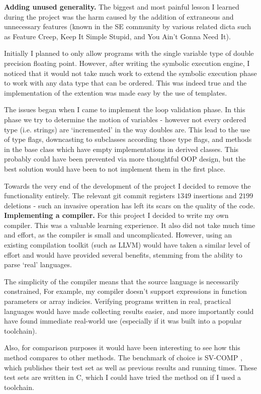 \documentclass[12pt,a4paper]{article}
\begin{document}
\textbf{Adding unused generality.} The biggest and most painful lesson I learned during the project was the harm caused by the addition of extraneous and unnecessary features (known in the SE community
by various related dicta such as Feature Creep, Keep It Simple Stupid, and You Ain't Gonna Need It).

Initially I planned to only allow programs with the single variable type
of double precision floating point. However, after writing the symbolic execution engine, I noticed that it would not take much work to extend the symbolic execution phase to work with any
data type that can be ordered. This was indeed true and the implementation of the extention was made easy by the use of templates.

The issues began when I came to implement the loop validation phase. In this phase we try to determine the motion of variables - however not every ordered type (i.e. strings) are `incremented' in the way doubles are. This lead to the use of type flags, downcasting to subclasses according those type flags, and methods in the
base class which have empty implementations in derived classes. This probably could have been prevented via more thoughtful OOP design, but the best solution would
have been to not implement them in the first place.

Towards the very end of the development of the project I decided to remove the functionality entirely. The relevant git commit registers
$1349$ insertions and $2199$ deletions - such an invasive operation has left its scars on the quality of the code.
\\

\textbf{Implementing a compiler.} For this project I decided to write my own compiler. This was a valuable learning experience. It also did not take much time and effort, as the compiler is small
and uncomplicated. However, using an existing compilation toolkit (such as LLVM) would have taken a similar level of effort and would have provided several benefits,
stemming from the ability to parse `real' languages.

The simplicity of the compiler means that the source language is necessarily constrained, For example, my compiler doesn't support 
expressions in function parameters or array indicies. Verifying programs written in real, practical languages would have made collecting results easier, and more 
importantly could have found immediate real-world use (especially if it was built into a popular toolchain).

Also, for comparison purposes it would have been interesting to see how this method
compares to other methods. The benchmark of choice is SV-COMP \citep{svcomp}, which publishes their test set as well as previous results and running times. These
test sets are written in C, which I could have tried the method on if I used a toolchain.\\
\end{document}
